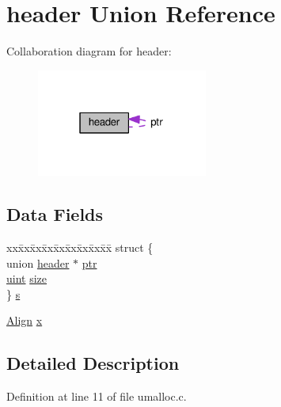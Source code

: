 \hypertarget{unionheader}{\section{header Union Reference}
\label{unionheader}
}


Collaboration diagram for header\-:
\nopagebreak
\begin{figure}[H]
\begin{center}
\leavevmode
\includegraphics[width=159pt]{unionheader__coll__graph}
\end{center}
\end{figure}
\subsection*{Data Fields}
\begin{DoxyCompactItemize}
\item 
\begin{tabbing}
xx\=xx\=xx\=xx\=xx\=xx\=xx\=xx\=xx\=\kill
struct \{\\
\>union \hyperlink{unionheader}{header} $\ast$ \hyperlink{unionheader_a0e84d7fb56aa45d0a3eb7083a5ff1b63}{ptr}\\
\>\hyperlink{types_8h_a91ad9478d81a7aaf2593e8d9c3d06a14}{uint} \hyperlink{unionheader_a22d26304a3b3aca97e6311f6939dd1bf}{size}\\
\} \hyperlink{unionheader_a1e57a8830c353d3a6cd627503cb18986}{s}\\

\end{tabbing}\item 
\hyperlink{umalloc_8c_aa508dd61e627680e57643837d292d89f}{Align} \hyperlink{unionheader_a5f369a9edd645986a45d0c159773c740}{x}
\end{DoxyCompactItemize}


\subsection{Detailed Description}


Definition at line 11 of file umalloc.\-c.



